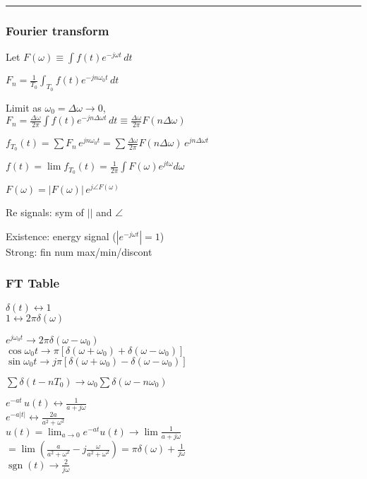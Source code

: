 \documentclass[4pt]{article}
\theoremstyle{definition}
\theoremstyle{definition}
\renewcommand{\o}{\omega}
\newcommand{\ra}{\rightarrow}
\newcommand{\lra}{\leftrightarrow}
\DeclareMathOperator{\sgn}{sgn}
\begin{document}
\rule{\linewidth}{0.5pt}
\newline
\subsubsection{Fourier transform}
    Let \(F(\omega) \equiv \int f(t) e^{-j\omega t} \, dt\)

    \(F_n = \frac 1 {T_0} \int_{T_0} f(t) e^{-jn\omega_0 t} \, dt\)

    Limit as $\omega_0 =\Delta\omega \ra 0$,\\
    \(F_n = \frac {\Delta\omega}{2\pi} \int f(t) e^{-jn\Delta\omega t} \, dt
    \equiv \frac{\Delta\omega}{2\pi} F(n\Delta\omega)\) %

    \(f_{T_0}(t) = \sum F_n\, e^{jn\omega_0 t} = \sum \frac {\Delta\omega} {2\pi} F(n\Delta\omega)\,  e^{jn\Delta\omega t}\)

    \(f(t) = \lim f_{T_0} (t) = \frac{1}{2\pi}\int F(\omega) e^{jt\omega} d\omega\)

    \(F(\omega) = |F(\omega)| \, e^{j\angle F(\omega)}\)

    Re signals: sym of $||$ and $\angle$

    Existence: energy signal ($|e^{-j\o t}| = 1$)\\
    Strong: fin num max/min/discont

\subsubsection{FT Table}

    \(\delta(t) \lra 1\)\\
    $1 \lra 2\pi\delta(\omega)$

    \(e^{j\o_0 t}\ra 2\pi\delta(\o - \o_0)\)\\         %
    \(\cos \o_0 t\ra \pi[\delta(\o+\o_0) + \delta(\o - \o_0)]\)\\
    \(\sin \o_0 t\ra j\pi[\delta(\o + \o_0) - \delta(\o - \o_0)]\)

    \(\sum \delta(t-nT_0) \ra \o_0\sum \delta(\o - n\o_0)\)        %

    $e^{-at} \, u(t) \lra \frac{1}{a+j\omega}$\\         %
    $e^{-a|t|} \lra \frac{2a}{a^2+\omega^2}$ \\
    \(u(t) = \lim_{a\ra 0} e^{-at} u(t)\ra \lim \frac{1}{a+j\o}\)
    \( = \lim(\frac{a}{a^2+\o^2} - j\frac{\o}{a^2+\o^2 }) = \pi\delta(\o) + \frac{1}{j\o}\) \\      %
    \(\sgn(t)\ra \frac{2}{j\o}\)
\end{document}
